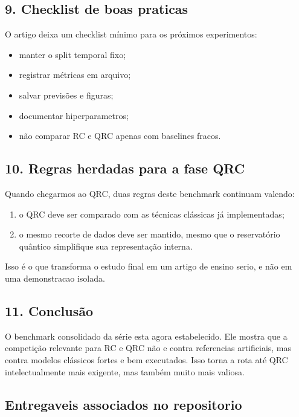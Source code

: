 \documentclass[12pt]{article}
\providecommand{\tightlist}{%
          \setlength{\itemsep}{0pt}\setlength{\parskip}{0pt}}
\begin{document}
\subsection{9. Checklist de boas praticas}\label{9-checklist-de-boas-praticas}

O artigo deixa um checklist mínimo para os próximos experimentos:

\begin{itemize}
\tightlist
\item
  manter o split temporal fixo;
\item
  registrar métricas em arquivo;
\item
  salvar previsões e figuras;
\item
  documentar hiperparametros;
\item
  não comparar RC e QRC apenas com baselines fracos.
\end{itemize}

\subsection{10. Regras herdadas para a fase QRC}\label{10-regras-herdadas-para-a-fase-qrc}

Quando chegarmos ao QRC, duas regras deste benchmark continuam valendo:

\begin{enumerate}
\def\labelenumi{\arabic{enumi}.}
\tightlist
\item
  o QRC deve ser comparado com as técnicas clássicas já implementadas;
\item
  o mesmo recorte de dados deve ser mantido, mesmo que o reservatório quântico simplifique sua representação interna.
\end{enumerate}

Isso é o que transforma o estudo final em um artigo de ensino serio, e não em uma demonstracao isolada.

\subsection{11. Conclusão}\label{11-conclusuxe3o}

O benchmark consolidado da série esta agora estabelecido. Ele mostra que a competição relevante para RC e QRC não e contra referencias artificiais, mas contra modelos clássicos fortes e bem executados. Isso torna a rota até QRC intelectualmente mais exigente, mas também muito mais valiosa.

\subsection{Entregaveis associados no repositorio}\label{entregaveis-associados-no-repositorio}
\end{document}
